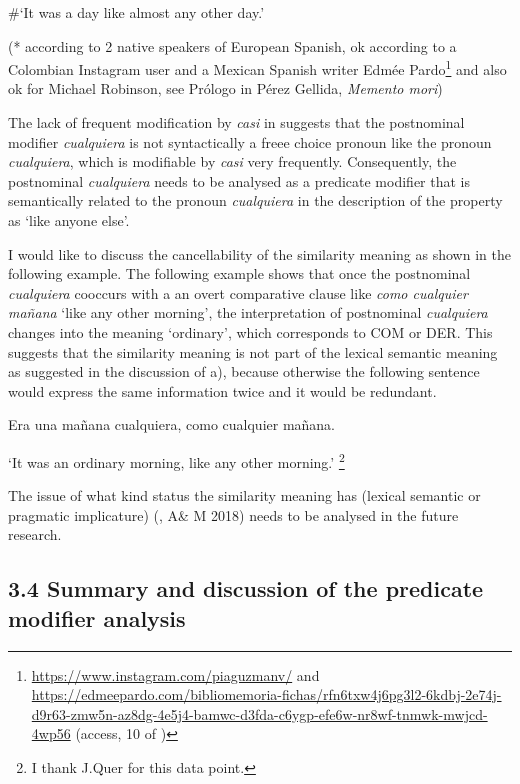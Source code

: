 \documentclass[output=paper]{langscibook}
\begin{document}
  \#‘It was a day like almost any other day.’

  (* according to 2 native speakers of European Spanish, ok according to a Colombian Instagram user and a Mexican Spanish writer Edmée Pardo\footnote{\url{https://www.instagram.com/piaguzmanv/}{ \textrm{and}} \url{https://edmeepardo.com/bibliomemoria-fichas/rfn6txw4j6pg3l2-6kdbj-2e74j-d9r63-zmw5n-az8dg-4e5j4-bamwc-d3fda-c6ygp-efe6w-nr8wf-tnmwk-mwjcd-4wp56} \textrm{(access, 10 of \citealt{November2023})}} and also ok for Michael Robinson, see Prólogo in Pérez Gellida, \textit{Memento mori})

The lack of frequent modification by \textit{casi} in  suggests that the postnominal modifier \textit{cualquiera} is not syntactically a freee choice pronoun like the pronoun \textit{cualquiera}, which is modifiable by \textit{casi} very frequently. Consequently, the postnominal \textit{cualquiera} needs to be analysed as a predicate modifier that is semantically related to the pronoun \textit{cualquiera} in the description of the property as ‘like anyone else’.

  I would like to discuss the cancellability of the similarity meaning as shown in the following example. The following example shows that once the postnominal \textit{cualquiera} cooccurs with a an overt comparative clause like \textit{como cualquier mañana} ‘like any other morning’, the interpretation of postnominal \textit{cualquiera} changes into the meaning ‘ordinary’, which corresponds to COM or DER. This suggests that the similarity meaning is not part of the lexical semantic meaning as suggested in the discussion of a), because otherwise the following sentence would express the same information twice and it would be redundant.   

  Era una mañana cualquiera, como cualquier mañana. 

‘It was an ordinary morning, like any other morning.’ \footnote{ \textrm{I thank J.Quer for this data point.} }   

The issue of what kind status the similarity meaning has (lexical semantic or pragmatic implicature) (\citealt{Aloni2021}, A\& M 2018) needs to be analysed in the future research.

\subsection{\textbf{3.4} \textbf{Summary} \textbf{and} \textbf{discussion} \textbf{of} \textbf{the} \textbf{predicate} \textbf{modifier} \textbf{analysis}}
\end{document}
